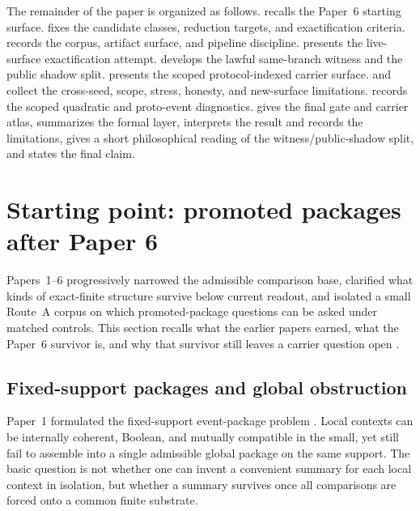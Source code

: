 \documentclass[11pt]{article}
\theoremstyle{definition}
\begin{document}
The remainder of the paper is organized as follows.  recalls the Paper~6 starting surface.  fixes the candidate classes, reduction targets, and exactification criteria.  records the corpus, artifact surface, and pipeline discipline.  presents the live-surface exactification attempt.  develops the lawful same-branch witness and the public shadow split.  presents the scoped protocol-indexed carrier surface.  and  collect the cross-seed, scope, stress, honesty, and new-surface limitations.  records the scoped quadratic and proto-event diagnostics.  gives the final gate and carrier atlas,  summarizes the formal layer,  interprets the result and records the limitations,  gives a short philosophical reading of the witness/public-shadow split, and  states the final claim.
 \section{Starting point: promoted packages after Paper 6}
\label{sec:paper6-starting-point}

Papers~1--6 progressively narrowed the admissible comparison base, clarified
what kinds of exact-finite structure survive below current readout, and isolated a
small Route~A corpus on which promoted-package questions can be asked under matched
controls. This section recalls what the earlier papers earned, what the Paper~6
survivor is, and why that survivor still leaves a carrier question open
\citep{Tsiokos2026EventPackages,Tsiokos2026HolonomyMemory,Tsiokos2026MarkingErasureRecombination,Tsiokos2026RecombinationWitnesses,Tsiokos2026PromotionCriteria,Tsiokos2026InternalStructure}.

\subsection{Fixed-support packages and global obstruction}

Paper~1 formulated the fixed-support event-package problem
\citep{Tsiokos2026EventPackages}. Local contexts can be internally coherent, Boolean,
and mutually compatible in the small, yet still fail to assemble into a single
admissible global package on the same support. The basic question is not whether one
can invent a convenient summary for each local context in isolation, but whether a
summary survives once all comparisons are forced onto a common finite substrate.
\end{document}
